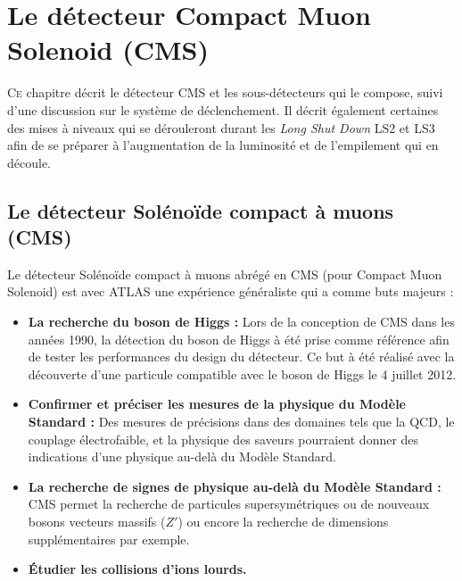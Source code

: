 \chapter{Le détecteur Compact Muon Solenoid (CMS)}
\renewcommand\chapterillustration{CMS/cms.jpeg}
\ThisULCornerWallPaper{1}{\chapterillustration}
\minitoc

\lettrine[lines=4, slope=-0.5em]{C}{e} chapitre décrit le détecteur CMS et les sous-détecteurs qui le compose, suivi d'une discussion sur le système de déclenchement. Il décrit également certaines des mises à niveaux qui se dérouleront durant les \textit{Long Shut Down} LS2 et LS3 afin de se préparer à l'augmentation de la luminosité et de l'empilement qui en découle.

\section{Le détecteur Solénoïde compact à muons (CMS)}
Le détecteur Solénoïde compact à muons abrégé en CMS (pour Compact Muon Solenoid) est avec ATLAS une expérience généraliste qui a comme buts majeurs :

\begin{itemize}[label=$\bullet$]
	\item \textbf{La recherche du boson de Higgs : } Lors de la conception de CMS dans les années \num{1990}, la détection du boson de Higgs à été prise comme référence afin de tester les performances du design du détecteur. Ce but à été réalisé avec la découverte d'une particule compatible avec le boson de Higgs le \num{4} juillet \num{2012}.
	\item \textbf{Confirmer et préciser les mesures de la physique du Modèle Standard : } Des mesures de précisions dans des domaines tels que la QCD, le couplage électrofaible, et la physique des saveurs pourraient donner des indications d'une physique au-delà du Modèle Standard.
	\item \textbf{La recherche de signes de physique au-delà du Modèle Standard : }CMS permet la recherche de particules supersymétriques ou de nouveaux bosons vecteurs massifs ($Z'$) ou encore la recherche de dimensions supplémentaires par exemple.
	\item \textbf{Étudier les collisions d'ions lourds.}
\end{itemize}

